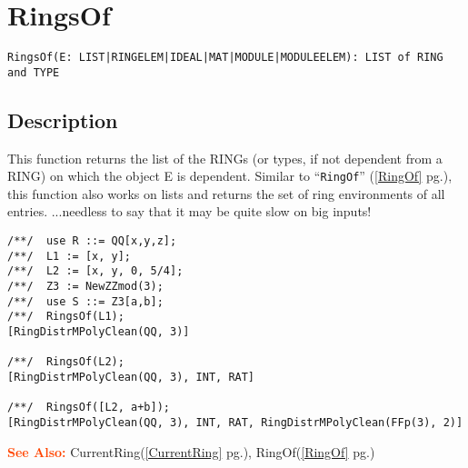 \documentclass[a4paper]{mybook}
\newenvironment{command}{}{} %
\newcommand\SeeAlso{\par\textcolor{OrangeRed}{\textbf{\large See Also: }}}
\begin{document}
\section{RingsOf}
\label{RingsOf}
\begin{command} %


\begin{Verbatim}[label=syntax, rulecolor=\color{MidnightBlue},
frame=single]
RingsOf(E: LIST|RINGELEM|IDEAL|MAT|MODULE|MODULEELEM): LIST of RING and TYPE
\end{Verbatim}


\subsection*{Description}

This function returns the list of the RINGs (or types, if not
dependent from a RING) on which the object E is dependent.
Similar to ``\verb&RingOf&'' (\ref{RingOf} pg.\pageref{RingOf}), this function also works on lists
and returns the set of ring environments of all entries.
...needless to say that it may be quite slow on big inputs!
\begin{Verbatim}[label=example, rulecolor=\color{PineGreen}, frame=single]
/**/  use R ::= QQ[x,y,z];
/**/  L1 := [x, y];
/**/  L2 := [x, y, 0, 5/4];
/**/  Z3 := NewZZmod(3);
/**/  use S ::= Z3[a,b];
/**/  RingsOf(L1);
[RingDistrMPolyClean(QQ, 3)]

/**/  RingsOf(L2);
[RingDistrMPolyClean(QQ, 3), INT, RAT]

/**/  RingsOf([L2, a+b]);
[RingDistrMPolyClean(QQ, 3), INT, RAT, RingDistrMPolyClean(FFp(3), 2)]
\end{Verbatim}


\SeeAlso %
  CurrentRing(\ref{CurrentRing} pg.\pageref{CurrentRing}), 
    RingOf(\ref{RingOf} pg.\pageref{RingOf})
\end{command} %
\end{document}
